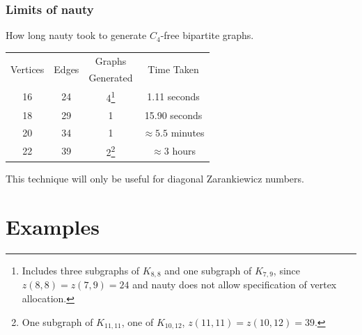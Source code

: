 \documentclass[pdf,hyperref={urlbordercolor={0 1 1}},xcolor=pdftex,dvipsnames]{beamer}
\begin{document}
\begin{frame}
  \frametitle{Limits of nauty}
  How long nauty took to generate $C_4$-free bipartite graphs.
  \begin{center}\begin{tabular}{| c | c | c | c |}\hline
    \multirow{2}{*}{Vertices} & \multirow{2}{*}{Edges} & Graphs & 
      \multirow{2}{*}{Time Taken} \\
    & & Generated & \\\hline\hline
    16 & 24 & 4\footnote{Includes three subgraphs of $K_{8,8}$ and one subgraph of
      $K_{7,9}$, since $z(8,8)=z(7,9)=24$ and nauty does not allow specification of
      vertex allocation.} & 1.11 seconds \\\hline
    18 & 29 & 1 & 15.90 seconds \\\hline
    20 & 34 & 1 & $\approx5.5$ minutes \\\hline
    22 & 39 & 2\footnote{One subgraph of $K_{11,11}$, one of $K_{10,12}$, 
      $z(11,11)=z(10,12)=39$.} & $\approx3$ hours \\\hline
  \end{tabular}\end{center}
  This technique will only be useful for diagonal Zarankiewicz numbers.
\end{frame}

\section{Examples}
\end{document}
